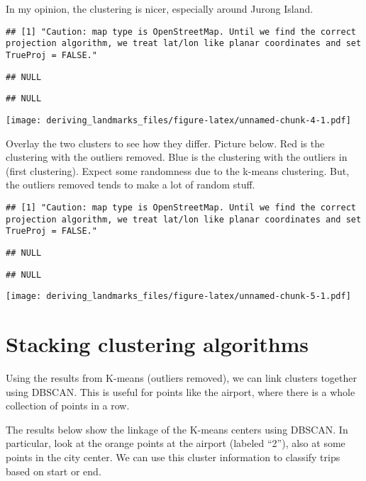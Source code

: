 \documentclass[]{article}
\begin{document}
In my opinion, the clustering is nicer, especially around Jurong Island.

\begin{verbatim}
## [1] "Caution: map type is OpenStreetMap. Until we find the correct projection algorithm, we treat lat/lon like planar coordinates and set TrueProj = FALSE."
\end{verbatim}

\begin{verbatim}
## NULL
\end{verbatim}

\begin{verbatim}
## NULL
\end{verbatim}

\texttt{[image: deriving\_landmarks\_files/figure-latex/unnamed-chunk-4-1.pdf]}

Overlay the two clusters to see how they differ. Picture below. Red is
the clustering with the outliers removed. Blue is the clustering with
the outliers in (first clustering). Expect some randomness due to the
k-means clustering. But, the outliers removed tends to make a lot of
random stuff.

\begin{verbatim}
## [1] "Caution: map type is OpenStreetMap. Until we find the correct projection algorithm, we treat lat/lon like planar coordinates and set TrueProj = FALSE."
\end{verbatim}

\begin{verbatim}
## NULL
\end{verbatim}

\begin{verbatim}
## NULL
\end{verbatim}

\texttt{[image: deriving\_landmarks\_files/figure-latex/unnamed-chunk-5-1.pdf]}

\hypertarget{stacking-clustering-algorithms}{%
\section{Stacking clustering
algorithms}\label{stacking-clustering-algorithms}}

Using the results from K-means (outliers removed), we can link clusters
together using DBSCAN. This is useful for points like the airport, where
there is a whole collection of points in a row.

The results below show the linkage of the K-means centers using DBSCAN.
In particular, look at the orange points at the airport (labeled ``2''),
also at some points in the city center. We can use this cluster
information to classify trips based on start or end.
\end{document}
